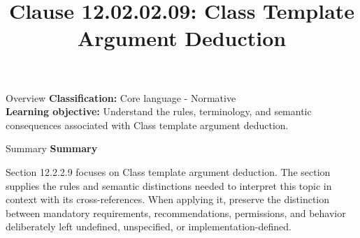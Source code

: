 \documentclass[10pt,letterpaper]{article}
\title{Clause 12.02.02.09: Class Template Argument Deduction}
\author{}
\date{}
\begin{document}
\maketitle
\begin{CornellOverviewBox}{Overview}
\textbf{Classification:} Core language - Normative\\[2pt]
\textbf{Learning objective:} Understand the rules, terminology, and semantic consequences associated with Class template argument deduction.
\end{CornellOverviewBox}\begin{CornellSummaryBox}{Summary}
{\sffamily\bfseries\color{Accent} Summary}\par\vspace{3pt}Section 12.2.2.9 focuses on Class template argument deduction. The section supplies the rules and semantic distinctions needed to interpret this topic in context with its cross-references. When applying it, preserve the distinction between mandatory requirements, recommendations, permissions, and behavior deliberately left undefined, unspecified, or implementation-defined.
\end{CornellSummaryBox}
\end{document}
